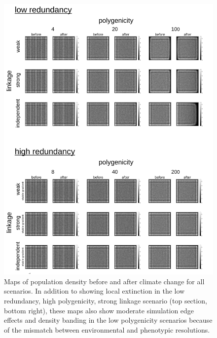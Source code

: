\documentclass[9pt,twoside,lineno]{new_article}
\begin{document}
\begin{figure}
\centering
\includegraphics[width=.8\linewidth]{pub/figs_and_stats/FIG_S3_density_shift.jpg}
\caption{Maps of population density before and after climate change for all scenarios. In addition to showing local extinction in the low redundancy, high polygenicity, strong linkage scenario (top section, bottom right), these maps also show moderate simulation edge effects and density banding in the low polygenicity scenarios because of the mismatch between environmental and phenotypic resolutions.}
\label{fig:fig_s3}
\end{figure}
\end{document}
